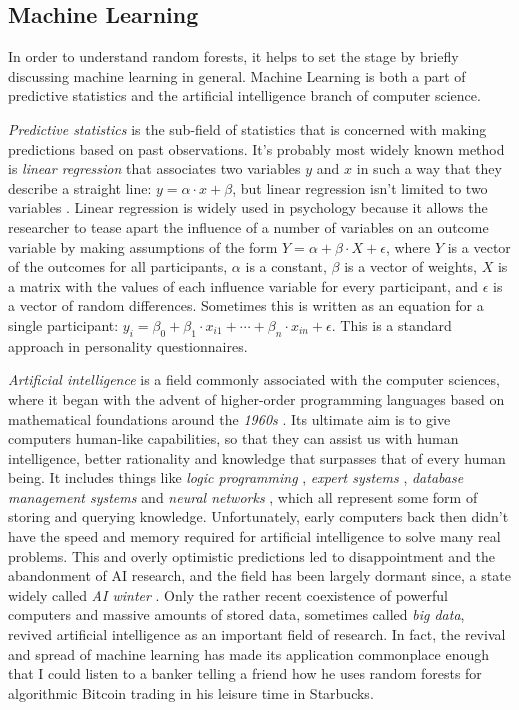 \documentclass[a4paper,man,12pt,apacite,floatsintext,draftfirst]{apa6} %
\begin{document}
\subsection{Machine Learning}
In order to understand random forests, it helps to set
the stage by briefly discussing machine learning in general.
Machine Learning is both a part of predictive statistics and the
artificial intelligence branch of computer science.

\emph{Predictive statistics} is the sub-field of statistics that is
concerned with making predictions based on past observations.
It's probably most widely known method is \emph{linear regression}
that associates two variables \(y\) and \(x\) in such a way
that they describe a straight line: \(y = \alpha \cdot x + \beta \), but
linear regression isn't limited to two variables \cite{borzlinreg}.
Linear regression is widely used in psychology because it
allows the researcher to tease apart the influence of a number of variables on an
outcome variable by making assumptions of the form
\( Y = \alpha + \beta \cdot X + \epsilon \), where \(Y\) is a vector of
the outcomes for all participants, \(\alpha\) is a constant,
\(\beta\) is a vector of weights, \(X\) is a matrix with the values of each influence variable for
every participant, and \(\epsilon\) is a vector of random differences.
Sometimes this is written as an equation for a single participant:
\( y_{i} = \beta_{0} + \beta_{1} \cdot x_{i1} + \dotsb + \beta_{n} \cdot x_{in} + \epsilon \).
This is a standard approach in personality questionnaires.

\emph{Artificial intelligence} is a field commonly associated with the
computer sciences, where it began with the advent of higher-order
programming languages based on mathematical foundations around the \emph{1960s} \cite{wpHOPL}.
Its ultimate aim is to give computers human-like capabilities,
so that they can assist us with human intelligence, better rationality
and knowledge that surpasses that of every human being.
It includes things like \emph{logic programming} \cite{wpLP, qai},
\emph{expert systems} \cite{wpES, qai}, \emph{database management systems} \cite{wpDB} and
\emph{neural networks} \cite{haykin, qai}, which all represent some form of
storing and querying knowledge.
Unfortunately, early computers back then didn't have the speed and memory
required for artificial intelligence to solve many real problems.
This and overly optimistic predictions led to disappointment and the abandonment of AI research,
and the field has been largely dormant since, a state widely called \emph{AI winter} \cite{qai, wpHOAI}.
Only the rather recent coexistence of powerful computers and massive amounts
of stored data, sometimes called \emph{big data}, revived artificial
intelligence as an important field of research.
In fact, the revival and spread of machine learning has made its application
commonplace enough that I could listen to a banker telling a friend how
he uses random forests for algorithmic Bitcoin trading in his leisure time
in Starbucks.
\end{document}
